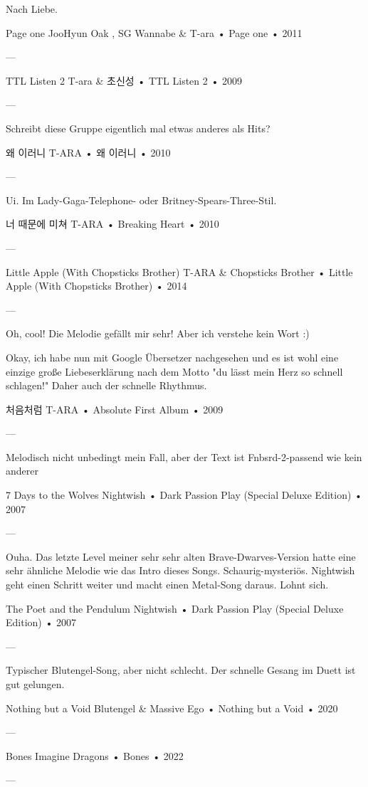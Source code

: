 Nach Liebe.

Page one
JooHyun Oak
,
SG Wannabe
 &
T-ara
 •
Page one
 •
2011

—

TTL Listen 2
T-ara
 &
초신성
 •
TTL Listen 2
 •
2009

—

Schreibt diese Gruppe eigentlich mal etwas anderes als Hits?

왜 이러니
T-ARA
 •
왜 이러니
 •
2010

—

Ui. Im Lady-Gaga-Telephone- oder Britney-Spears-Three-Stil.

너 때문에 미쳐
T-ARA
 •
Breaking Heart
 •
2010

—

Little Apple (With Chopsticks Brother)
T-ARA & Chopsticks Brother
 •
Little Apple (With Chopsticks Brother)
 •
2014

—

Oh, cool! Die Melodie gefällt mir sehr!
Aber ich verstehe kein Wort :)

Okay, ich habe nun mit Google Übersetzer nachgesehen und es ist wohl eine einzige große Liebeserklärung nach dem Motto "du lässt mein Herz so schnell schlagen!" Daher auch der schnelle Rhythmus.

처음처럼
T-ARA
 •
Absolute First Album
 •
2009

—

Melodisch nicht unbedingt mein Fall, aber der Text ist Fnbsrd-2-passend wie kein anderer

7 Days to the Wolves
Nightwish
 •
Dark Passion Play (Special Deluxe Edition)
 •
2007

—

Ouha. Das letzte Level meiner sehr sehr alten Brave-Dwarves-Version hatte eine sehr ähnliche Melodie wie das Intro dieses Songs. Schaurig-mysteriös.
Nightwish geht einen Schritt weiter und macht einen Metal-Song daraus.
Lohnt sich.

The Poet and the Pendulum
Nightwish
 •
Dark Passion Play (Special Deluxe Edition)
 •
2007

—

Typischer Blutengel-Song, aber nicht schlecht. Der schnelle Gesang im Duett ist gut gelungen.

Nothing but a Void
Blutengel
 &
Massive Ego
 •
Nothing but a Void
 •
2020

—

Bones
Imagine Dragons
 •
Bones
 •
2022

—

